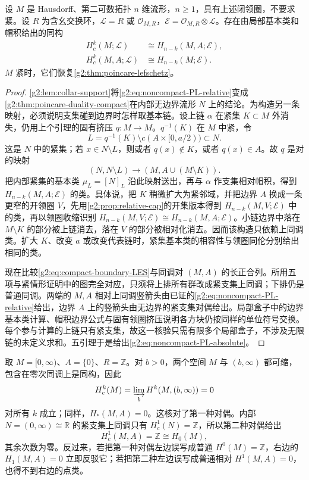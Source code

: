 \begin{theorem}\label{g2:thm:noncompact-lefschetz}
	设 \(M\) 是 Hausdorff、第二可数拓扑 \(n\) 维流形，\(n\geq1\)，具有上述闭领圈，不要求紧。设 \(R\) 为含幺交换环，\(\mathcal L=R\) 或 \(\mathcal O_{M,R}\)，\(\mathcal E=\mathcal O_{M,R}\otimes\mathcal L\)。存在由局部基本类和帽积给出的同构
	\begin{align}
		H_c^k(M;\mathcal L)&\cong H_{n-k}(M,A;\mathcal E),\label{g2:eq:noncompact-PL-absolute}\\
		H_c^k(M,A;\mathcal L)&\cong H_{n-k}(M;\mathcal E).\label{g2:eq:noncompact-PL-relative}
	\end{align}
	\(M\) 紧时，它们恢复\cref{g2:thm:poincare-lefschetz}。
\end{theorem}
\begin{proof}
	\cref{g2:lem:collar-support}将\eqref{g2:eq:noncompact-PL-relative}变成\cref{g2:thm:poincare-duality-compact}在内部无边界流形 \(N\) 上的结论。为构造另一条映射，必须说明支集碰到边界时怎样取基本链。设上链 \(\alpha\) 在紧集 \(K\subset M\) 外消失，仍用上个引理的固有挤压 \(q:M\to M\)。\(q^{-1}(K)\) 在 \(M\) 中紧，令
	\[
		L=q^{-1}(K)\setminus c(A\times[0,a/2))\subset N.
	\]
	这是 \(N\) 中的紧集；若 \(x\in N\setminus L\)，则或者 \(q(x)\notin K\)，或者 \(q(x)\in A\)。故 \(q\) 是对的映射
	\[
		(N,N\setminus L)\longrightarrow(M,A\cup(M\setminus K)).
	\]
	把内部紧集的基本类 \(\mu_L=[N]_L\) 沿此映射送出，再与 \(\alpha\) 作支集相对帽积，得到 \(H_{n-k}(M,A;\mathcal E)\) 的类。具体说，把 \(K\) 稍微扩大为紧邻域，并把边界 \(A\) 换成一条更窄的开领圈 \(V\)，先用\cref{g2:prop:relative-cap}的开集版本得到 \(H_{n-k}(M,V;\mathcal E)\) 中的类，再以领圈收缩识别 \(H_{n-k}(M,V;\mathcal E)\cong H_{n-k}(M,A;\mathcal E)\)。小链边界中落在 \(M\setminus K\) 的部分被上链消去，落在 \(V\) 的部分被相对化消去。因而该构造只依赖上同调类。扩大 \(K\)、改变 \(a\) 或改变代表链时，紧集基本类的相容性与领圈同伦分别给出相同的类。

	现在比较\eqref{g2:eq:compact-boundary-LES}与同调对 \((M,A)\) 的长正合列。所用五项与紧情形证明中的图完全对应，只须将上排所有群改成紧支集上同调；下排仍是普通同调。两端的 \(M,A\) 相对上同调竖箭头由已证的\eqref{g2:eq:noncompact-PL-relative}给出，边界 \(A\) 上的竖箭头由无边界的紧支集对偶给出。局部盒子中的边界基本类计算、帽积边界公式与固有领圈挤压说明各方块仍按同样的单位符号交换。每个参与计算的上链只有紧支集，故这一核验只需有限多个局部盒子，不涉及无限链的未定义求和。五引理于是给出\eqref{g2:eq:noncompact-PL-absolute}。
\end{proof}

\begin{example}\label{g2:exm:half-line-duality}
	取 \(M=[0,\infty)\)、\(A=\{0\}\)、\(R=\mathbb Z\)。对 \(b>0\)，两个空间 \(M\) 与 \((b,\infty)\) 都可缩，包含在零次同调上是同构，因此
	\[
		H_c^k(M)=\varinjlim_b H^k(M,(b,\infty))=0
	\]
	对所有 \(k\) 成立；同样，\(H_*(M,A)=0\)。这核对了第一种对偶。内部 \(N=(0,\infty)\cong\mathbb R\) 的紧支集上同调只有 \(H_c^1(N)=\mathbb Z\)，所以第二种对偶给出
	\[
		H_c^1(M,A)=\mathbb Z\cong H_0(M),
	\]
	其余次数为零。反过来，若把第一种对偶左边误写成普通 \(H^0(M)=\mathbb Z\)，右边的 \(H_1(M,A)=0\) 立即反驳它；若把第二种左边误写成普通相对 \(H^1(M,A)=0\)，也得不到右边的点类。
\end{example}

